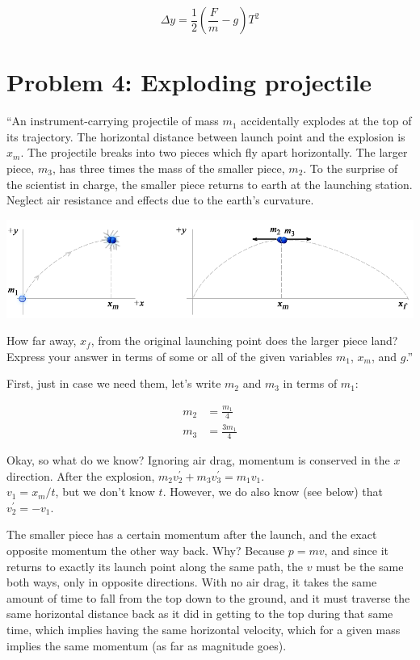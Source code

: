 \documentclass[12pt,a4paper]{report}
\begin{document}
\begin{equation}
\Delta y = \frac{1}{2} (\frac{F}{m} - g) T^2
\end{equation}

\section{Problem 4: Exploding projectile}

``An instrument-carrying projectile of mass $m_1$ accidentally explodes at the top of its trajectory. The horizontal distance between launch point and the explosion is $x_m$. The projectile breaks into two pieces which fly apart horizontally. The larger piece, $m_3$, has three times the mass of the smaller piece, $m_2$. To the surprise of the scientist in charge, the smaller piece returns to earth at the launching station. Neglect air resistance and effects due to the earth's curvature.

\begin{center}
\includegraphics[scale=0.6]{Graphics/h6p4}
\end{center}

How far away, $x_f$, from the original launching point does the larger piece land? Express your answer in terms of some or all of the given variables $m_1$, $x_m$, and $g$.''

First, just in case we need them, let's write $m_2$ and $m_3$ in terms of $m_1$:

\begin{align}
m_2 &= \frac{m_1}{4}\\
m_3 &= \frac{3 m_1}{4}
\end{align}

Okay, so what do we know? Ignoring air drag, momentum is conserved in the $x$ direction. After the explosion, $m_2 v_2^{'} + m_3 v_3^{'} = m_1 v_1$.\\
$v_1 = x_m/t$, but we don't know $t$. However, we do also know (see below) that $v_2^{'} = - v_1$.

The smaller piece has a certain momentum after the launch, and the exact opposite momentum the other way back. Why? Because $p = m v$, and since it returns to exactly its launch point along the same path, the $v$ must be the same both ways, only in opposite directions. With no air drag, it takes the same amount of time to fall from the top down to the ground, and it must traverse the same horizontal distance back as it did in getting to the top during that same time, which implies having the same horizontal velocity, which for a given mass implies the same momentum (as far as magnitude goes).
\end{document}
